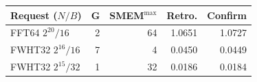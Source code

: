 \begingroup
\setlength{\tabcolsep}{3pt}
\begin{tabular}{@{}lrrrr@{}}
\toprule
Request ($N/B$) & G & SMEM$^{\max}$ & Retro. & Confirm\\\midrule
FFT64 $2^{20}/16$ & 2 & 64 & 1.0651 & 1.0727\\
FWHT32 $2^{16}/16$ & 7 & 4 & 0.0450 & 0.0449\\
FWHT32 $2^{15}/32$ & 1 & 32 & 0.0186 & 0.0184\\
\bottomrule
\end{tabular}
\endgroup
